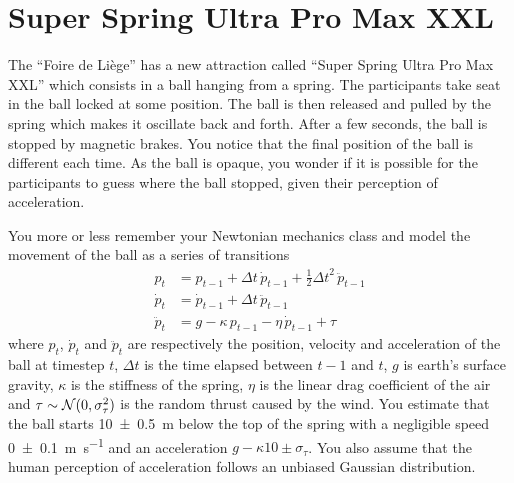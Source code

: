 \documentclass[11pt, a4paper]{article}
\begin{document}
\newpage

\section{Super Spring Ultra Pro Max XXL}

The \enquote{Foire de Liège} has a new attraction called \enquote{Super Spring Ultra Pro Max XXL} which consists in a ball hanging from a spring. The participants take seat in the ball locked at some position. The ball is then released and pulled by the spring which makes it oscillate back and forth. After a few seconds, the ball is stopped by magnetic brakes. You notice that the final position of the ball is different each time. As the ball is opaque, you wonder if it is possible for the participants to guess where the ball stopped, given their perception of acceleration.

You more or less remember your Newtonian mechanics class and model the movement of the ball as a series of transitions
\begin{align*}
    p_t & = p_{t-1} + \Delta t \, \dot{p}_{t - 1} + \frac{1}{2} {\Delta t}^2 \, \ddot{p}_{t - 1} \\
    \dot{p}_t & = \dot{p}_{t - 1} + \Delta t \, \ddot{p}_{t - 1} \\
    \ddot{p}_t & = g - \kappa \, p_{t - 1} - \eta \, \dot{p}_{t - 1} + \tau
\end{align*}
where $p_t$, $\dot{p}_t$ and $\ddot{p}_t$ are respectively the position, velocity and acceleration of the ball at timestep $t$, $\Delta t$ is the time elapsed between $t-1$ and $t$, $g$ is earth's surface gravity, $\kappa$ is the stiffness of the spring, $\eta$ is the linear drag coefficient of the air and $\tau \sim \mathcal{N}(0, \sigma_\tau^2)$ is the random thrust caused by the wind. You estimate that the ball starts \qty{10 \pm 0.5}{\meter} below the top of the spring with a negligible speed \qty{0 \pm 0.1}{\meter\per\second} and an acceleration $g - \kappa 10 \pm \sigma_\tau$. You also assume that the human perception of acceleration follows an unbiased Gaussian distribution.
\end{document}
